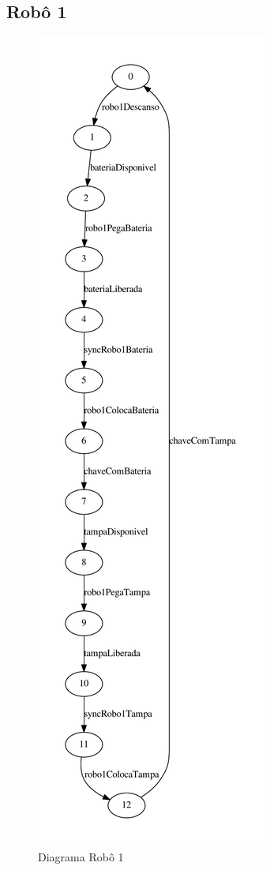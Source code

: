 \documentclass[a4paper,11pt,twocolumns]{article}
\begin{document}
\subsection{Robô 1}

\begin{figure}[H]
    \centering
    \includegraphics[height = 0.9\textheight]{./img/g_robo1.pdf}
    \caption{Diagrama Robô 1}
    \label{fig:g_robo1}
\end{figure}
\end{document}
